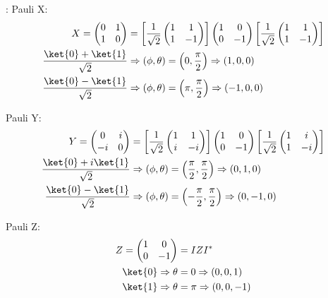 \par {}:
%
Pauli X:
\begin{align}
X = \begin{pmatrix} 0 & 1 \\ 1 & 0 \end{pmatrix}
&=
\left[ \frac{1}{\sqrt{2}} \begin{pmatrix} 1 & 1 \\ 1 & -1 \end{pmatrix} \right]
\begin{pmatrix} 1 & 0 \\ 0 & -1 \end{pmatrix}
\left[ \frac{1}{\sqrt{2}} \begin{pmatrix} 1 & 1 \\ 1 & -1 \end{pmatrix} \right] \\
\frac{\ket{0} + \ket{1}}{\sqrt{2}} &\Rightarrow \left( \phi, \theta \right) = \left( 0, \frac{\pi}{2} \right) \Rightarrow \left( 1, 0, 0 \right) \\
\frac{\ket{0} - \ket{1}}{\sqrt{2}} &\Rightarrow \left( \phi, \theta \right) = \left( \pi, \frac{\pi}{2} \right) \Rightarrow \left( -1, 0, 0 \right)
\end{align}
%
\par Pauli Y:
%
\begin{align}
Y = \begin{pmatrix} 0 & i \\ -i & 0 \end{pmatrix}
&=
\left[ \frac{1}{\sqrt{2}} \begin{pmatrix} 1 & 1 \\ i & -i \end{pmatrix} \right]
\begin{pmatrix} 1 & 0 \\ 0 & -1 \end{pmatrix}
\left[ \frac{1}{\sqrt{2}} \begin{pmatrix} 1 & i \\ 1 & -i \end{pmatrix} \right] \\
\frac{\ket{0} + i \ket{1}}{\sqrt{2}} &\Rightarrow \left( \phi, \theta \right) = \left( \frac{\pi}{2}, \frac{\pi}{2} \right) \Rightarrow \left( 0, 1, 0 \right) \\
\frac{\ket{0} - \ket{1}}{\sqrt{2}} &\Rightarrow \left( \phi, \theta \right) = \left( -\frac{\pi}{2}, \frac{\pi}{2} \right) \Rightarrow \left( 0, -1, 0 \right)
\end{align}
%
\par Pauli Z:
%
\begin{align}
Z = \begin{pmatrix} 1 & 0 \\ 0 & -1 \end{pmatrix} &= I Z I^* \\
\ket{0} \Rightarrow \theta &= 0 \Rightarrow \left( 0, 0, 1 \right) \\
\ket{1} \Rightarrow \theta &= \pi \Rightarrow \left( 0, 0, -1 \right)
\end{align}
